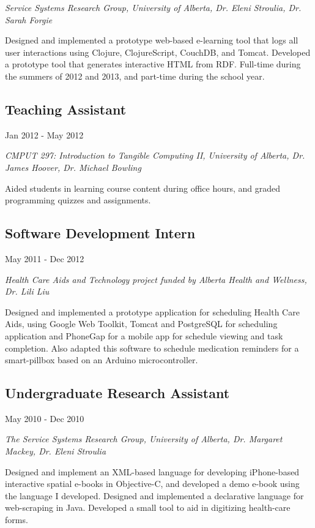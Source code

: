 \documentclass[10pt]{article}
\begin{document}
\emph{Service Systems Research Group, University of Alberta, Dr. Eleni Stroulia, Dr. Sarah Forgie}
\vspace{\baselineskip}

Designed and implemented a prototype web-based e-learning tool that logs all user interactions using Clojure, ClojureScript, CouchDB, and Tomcat. Developed a prototype tool that generates interactive HTML from RDF. Full-time during the summers of 2012 and 2013, and part-time during the school year.

\subsection*{Teaching Assistant}
Jan 2012 - May 2012

\emph{CMPUT 297: Introduction to Tangible Computing II, University of Alberta, Dr. James Hoover, Dr. Michael Bowling}
\vspace{\baselineskip}

Aided students in learning course content during office hours, and graded programming quizzes and assignments.

\subsection*{Software Development Intern}
May 2011 - Dec 2012

\emph{Health Care Aids and Technology project funded by Alberta Health and Wellness, Dr. Lili Liu}
\vspace{\baselineskip}

Designed and implemented a prototype application for scheduling Health Care Aids, using Google Web Toolkit, Tomcat and PostgreSQL for scheduling application and PhoneGap for a mobile app for schedule viewing and task completion. Also adapted this software to schedule medication reminders for a smart-pillbox based on an Arduino microcontroller.

\subsection*{Undergraduate Research Assistant}
May 2010 - Dec 2010

\emph{The Service Systems Research Group, University of Alberta, Dr. Margaret Mackey, Dr. Eleni Stroulia}
\vspace{\baselineskip}

Designed and implement an XML-based language for developing iPhone-based interactive spatial e-books in Objective-C, and developed a demo e-book using the language I developed. Designed and implemented a declarative language for web-scraping in Java. Developed a small tool to aid in digitizing health-care forms.
\end{document}
